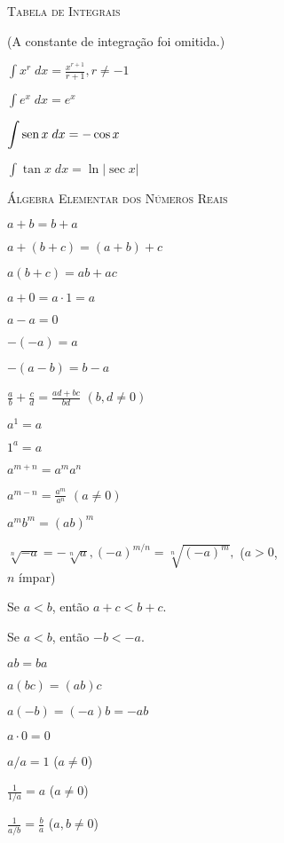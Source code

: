 \documentclass{svmono}
\begin{document}
\textsc{Tabela de Integrais}

\def\dx{\;dx}

{\small
(A constante de integração foi omitida.)

\begin{multicols}{2}
$\displaystyle \int x^r \dx = \frac{x^{r+1}}{r+1}, r \ne -1$

$\displaystyle \int e^x \dx = e^x$

$\displaystyle \int \sen x \dx = - \cos x$

$\displaystyle \int \tan x \dx = \ln|\sec x|$
\end{multicols}
}

\newpage

\textsc{Álgebra Elementar dos Números Reais}

\begin{multicols}{2}
$a + b = b + a$

$a + (b + c) = (a + b) + c$

$a(b+c) = ab+ac$

$a + 0 = a \cdot 1 = a$

$a - a = 0$

$-(-a) = a$

$-(a-b) = b - a$

$\displaystyle \frac{a}{b} + \frac{c}{d} = \frac{ad + bc}{bd}$ $(b,d \ne 0)$

$a^1 = a$

$1^a = a$

$a^{m+n} = a^m a^n$

$\displaystyle a^{m-n} = \frac{a^m}{a^n}$ $(a \ne 0)$

$a^m b^m = (ab)^m$

$\displaystyle \sqrt[n]{-a} = -\sqrt[n]{a}, (-a)^{m/n} = \sqrt[n]{(-a)^m},$ ($a > 0$,\\
\hspace*{\fill} $n$ ímpar) \hspace*{2ex}

Se $a < b$, então $a + c < b + c$.

Se $a < b$, então $-b < -a$.

$ab = ba$

$a(bc) = (ab)c$

$a(-b) = (-a)b = -ab$

$a \cdot 0 = 0$

$a/a = 1$ ($a \ne 0$)

$\displaystyle \frac{1}{1/a} = a$ ($a \ne 0$)

$\displaystyle \frac{1}{a/b} = \frac{b}{a}$ ($a,b \ne 0$)


\end{multicols}
\end{document}
